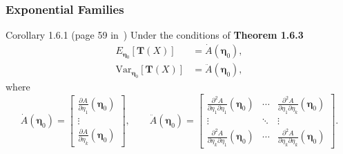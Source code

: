 \documentclass[serif,mathserif,professionalfont]{beamer}
\begin{document}
\begin{frame}
	
	\frametitle{Exponential Families}
	
	\begin{block}{Corollary 1.6.1 (page 59 in~\cite{BD2015})}
		Under the conditions of \textbf{Theorem 1.6.3}
		\begin{equation*}
		\begin{split}
		E_{\boldsymbol{\eta}_0}\left[\bm{T}\left(X \right) \right] & = \dot{A}\left(\boldsymbol{\eta}_0 \right), \\
		\text{Var}_{\boldsymbol{\eta}_0}\left[\bm{T}\left(X \right) \right] & = \ddot{A}\left(\boldsymbol{\eta}_0 \right),
		\end{split}
		\end{equation*}
		where
		\begin{equation*}
		\dot{A}\left(\boldsymbol{\eta}_0 \right) =  
		\begin{bmatrix}
		\frac{\partial A}{\partial \eta_1}\left(\boldsymbol{\eta}_0 \right) \\
		\vdots \\
		\frac{\partial A}{\partial \eta_k}\left(\boldsymbol{\eta}_0 \right)
		\end{bmatrix},
		\qquad 
		\ddot{A}\left(\boldsymbol{\eta}_0 \right) = 
		\begin{bmatrix}
		\frac{\partial^2 A}{\partial \eta_1 \partial \eta_1}\left(\boldsymbol{\eta}_0 \right) & \cdots & \frac{\partial^2 A}{\partial \eta_1 \partial \eta_k}\left(\boldsymbol{\eta}_0 \right) \\
		\vdots & \ddots & \vdots \\
		\frac{\partial^2 A}{\partial \eta_k \partial \eta_1}\left(\boldsymbol{\eta}_0 \right) & \cdots & \frac{\partial^2 A}{\partial \eta_k \partial \eta_k}\left(\boldsymbol{\eta}_0 \right)
		\end{bmatrix}.
		\end{equation*}
	\end{block}
	
\end{frame}
\end{document}
